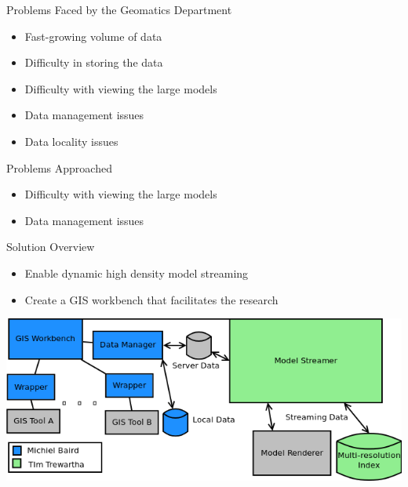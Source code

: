 \documentclass{beamer}
\begin{document}
\begin{frame}{Problems Faced by the Geomatics Department}
\begin{itemize}
    \item Fast-growing volume of data
    \item Difficulty in storing the data
    \item Difficulty with viewing the large models
    \item Data management issues
    \item Data locality issues
\end{itemize}
\end{frame}


\begin{frame}{Problems Approached}
    \begin{itemize}
        \item Difficulty with viewing the large models
        \item Data management issues
    \end{itemize}
\end{frame}

\begin{frame}{Solution Overview}

\begin{itemize}
\item Enable dynamic high density model streaming
\item Create a GIS workbench that facilitates the research
    \end{itemize}
    \begin{center}
    \includegraphics[width=0.8\linewidth]{images/mainDiagram.png}
    \end{center}
\end{frame}
\end{document}
